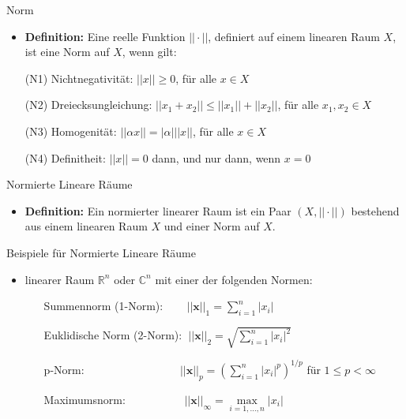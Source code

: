 \documentclass[14pt, aspectratio=169, handout]{beamer}
\begin{document}
\begin{frame}{Norm}
\begin{itemize}
    \item \textbf{Definition:} Eine reelle Funktion $||\cdot ||$, definiert auf einem linearen Raum $X$, ist eine Norm auf $X$, wenn gilt:
    \item[] 
    \item[(N1)] Nichtnegativität: $||x|| \geq 0$, für alle $x\in X$
    \item[(N2)] Dreiecksungleichung: $||x_1 + x_2|| \leq ||x_1|| + ||x_2||$, für alle $x_1, x_2\in X$
    \item[(N3)] Homogenität: $||\alpha x|| = |\alpha| ||x||$, für alle $x\in X$
    \item[(N4)] Definitheit: $||x||=0$ dann, und nur dann, wenn $x=0$

\end{itemize}
\end{frame}

\begin{frame}{Normierte Lineare Räume}
    \begin{itemize}
        \item \textbf{Definition:} Ein normierter linearer Raum ist ein Paar $(X, ||\cdot||)$ bestehend aus einem linearen Raum $X$ und einer Norm auf $X$.
    \end{itemize}
\end{frame}

\begin{frame}{Beispiele für Normierte Lineare Räume}
    \begin{itemize}
        \item linearer Raum $\mathbb{R}^n$ oder $\mathbb{C}^n$ mit einer der folgenden Normen: \begin{itemize}
        \item[] 
        \item[] Summennorm (1-Norm): $\hspace{22pt}||\mathbf{x}||_1 = \sum_{i=1}^n |x_i|$
        \item[] 
        \item[] Euklidische Norm (2-Norm): $\hspace{3pt}||\mathbf{x}||_2 = \sqrt{\sum_{i=1}^n |x_i|^2}$
        \item[] 
        \item[] p-Norm: $\hspace{100pt}||\mathbf{x}||_p = \left(\sum_{i=1}^n |x_i|^p\right)^{1/p}$ für $1\leq p < \infty$
        \item[] 
        \item[] Maximumsnorm: $\hspace{60pt}||\mathbf{x}||_\infty = \underset{i=1,\dots,n}{\max}|x_i|$
        \end{itemize}
    \end{itemize}
\end{frame}
\end{document}
